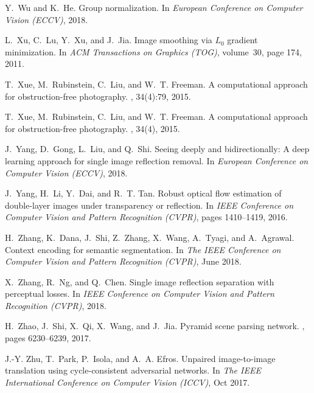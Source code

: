 \documentclass[10pt,twocolumn,letterpaper]{article}
\begin{document}
{\begin{thebibliography}{10}
Y.~Wu and K.~He.
\newblock Group normalization.
\newblock In {\em European Conference on Computer Vision (ECCV)}, 2018.

L.~Xu, C.~Lu, Y.~Xu, and J.~Jia.
\newblock Image smoothing via {$L_0$} gradient minimization.
\newblock In {\em ACM Transactions on Graphics (TOG)}, volume~30, page 174,
  2011.

T.~Xue, M.~Rubinstein, C.~Liu, and W.~T. Freeman.
\newblock A computational approach for obstruction-free photography.
, 34(4):79, 2015.

T.~Xue, M.~Rubinstein, C.~Liu, and W.~T. Freeman.
\newblock A computational approach for obstruction-free photography.
, 34(4), 2015.

J.~Yang, D.~Gong, L.~Liu, and Q.~Shi.
\newblock Seeing deeply and bidirectionally: A deep learning approach for
  single image reflection removal.
\newblock In {\em European Conference on Computer Vision (ECCV)}, 2018.

J.~Yang, H.~Li, Y.~Dai, and R.~T. Tan.
\newblock Robust optical flow estimation of double-layer images under
  transparency or reflection.
\newblock In {\em IEEE Conference on Computer Vision and Pattern Recognition
  (CVPR)}, pages 1410--1419, 2016.

H.~Zhang, K.~Dana, J.~Shi, Z.~Zhang, X.~Wang, A.~Tyagi, and A.~Agrawal.
\newblock Context encoding for semantic segmentation.
\newblock In {\em The IEEE Conference on Computer Vision and Pattern
  Recognition (CVPR)}, June 2018.

X.~Zhang, R.~Ng, and Q.~Chen.
\newblock Single image reflection separation with perceptual losses.
\newblock In {\em IEEE Conference on Computer Vision and Pattern Recognition
  (CVPR)}, 2018.

H.~Zhao, J.~Shi, X.~Qi, X.~Wang, and J.~Jia.
\newblock Pyramid scene parsing network.
, pages 6230--6239, 2017.

J.-Y. Zhu, T.~Park, P.~Isola, and A.~A. Efros.
\newblock Unpaired image-to-image translation using cycle-consistent
  adversarial networks.
\newblock In {\em The IEEE International Conference on Computer Vision (ICCV)},
  Oct 2017.
\end{thebibliography}

}
\end{document}
